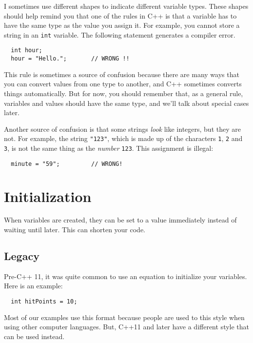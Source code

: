 \vspace{0.1in}
\centerline{}
\vspace{0.1in}

I sometimes use different shapes to indicate different
variable types.  These shapes should help remind you that one of the
rules in C++ is that a variable has to have the same type as the
value you assign it.  For example, you cannot store a string in
an {\tt int} variable.  The following statement generates a compiler
error.

\begin{lstlisting}
  int hour;
  hour = "Hello.";       // WRONG !!
\end{lstlisting}

%
This rule is sometimes a source of confusion because there are many
ways that you can convert values from one type to another, and C++
sometimes converts things automatically.  But for now, you should
remember that, as a general rule, variables and values should have the same
type, and we'll talk about special cases later.

Another source of confusion is that some strings {\em look}
like integers, but they are not.  For example,
the string {\tt "123"}, which is made up of the
characters {\tt 1}, {\tt 2} and {\tt 3}, is not
the same thing as the {\em number} {\tt 123}.
This assignment is illegal:

\begin{lstlisting}
  minute = "59";         // WRONG!
\end{lstlisting}
%
\section{Initialization}
When variables are created, they can be set to a value immediately instead of waiting until later. This can shorten your code. 

\subsection{Legacy}
Pre-C++ 11, it was quite common to use an equation to initialize 
your variables.
Here is an example:
\begin{lstlisting}
  int hitPoints = 10;
\end{lstlisting}
Most of our examples use this format because people are used to 
this style when using other computer languages. But, C++11 and later
have a different style that can be used instead.
